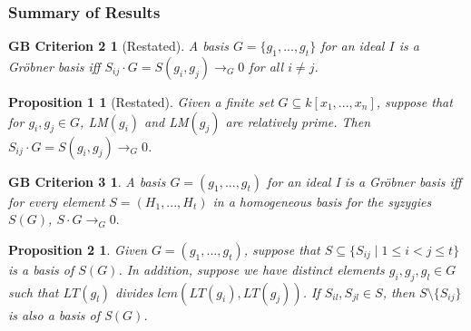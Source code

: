 \documentclass{beamer}
\newtheorem{prop1}{Proposition 1}
\newtheorem{prop2}{Proposition 2}
\newtheorem{gbc2}{GB Criterion 2}
\newtheorem{gbc3}{GB Criterion 3}
\begin{document}
\begin{frame}
\begin{small}
\frametitle{Summary of Results}
\begin{gbc2}[Restated]
A basis $G = \{g_1, ..., g_t\}$ for an ideal $I$ is a Gr{\"o}bner basis iff $S_{ij}\cdot G = S(g_i,g_j)\rightarrow_G 0$ for all $i\neq j$.
\end{gbc2}

\begin{prop1}[Restated]
Given a finite set $G\subseteq k[x_1,...,x_n]$, suppose that for $g_i,g_j\in G$, LM$(g_i)$ and LM$(g_j)$ are relatively prime. Then $S_{ij}\cdot G = S(g_i,g_j) \rightarrow_G 0$.
\end{prop1}

\begin{gbc3}
A basis $G = (g_1, ..., g_t)$ for an ideal I is a Gr{\"o}bner basis iff for every element $S = (H_1,...,H_t)$ in a homogeneous basis for the syzygies $S(G)$, $S\cdot G \rightarrow_G 0.$ 
\end{gbc3}

\begin{prop2}
Given $G = (g_1,...,g_t)$, suppose that $S\subseteq \{S_{ij}\mid 1\leq i<j\leq t\}$ is a basis of $S(G)$. In addition, suppose we have distinct elements $g_i, g_j, g_l\in G$ such that $LT(g_l)$ divides $lcm(LT(g_i),LT(g_j))$. If $S_{il}, S_{jl}\in S$, then $S\setminus \{S_{ij}\}$ is also a basis of S$(G)$. 
\end{prop2}
\end{small}



\end{frame}


\end{document}
